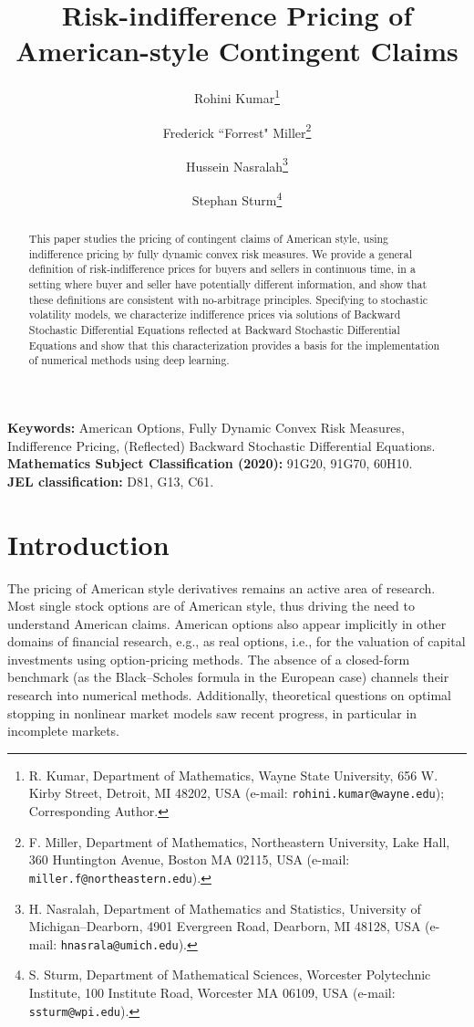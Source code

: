 \documentclass{article}
\title{Risk-indifference Pricing of American-style Contingent Claims}
\author{
Rohini Kumar\thanks{%
R. Kumar, Department of Mathematics, Wayne State University, 656 W. Kirby Street, Detroit, MI 48202, USA (e-mail: 
\texttt{rohini.kumar@wayne.edu}); Corresponding Author.}
\and
Frederick ``Forrest" Miller\thanks{%
F. Miller, Department of Mathematics, Northeastern University, Lake Hall, 360 Huntington Avenue, Boston MA 02115, USA (e-mail: 
\texttt{miller.f@northeastern.edu}).}
\and
Hussein Nasralah\thanks{%
H. Nasralah, Department of Mathematics and Statistics, University of Michigan--Dearborn, 4901 Evergreen Road, Dearborn, MI 48128, USA (e-mail: 
\texttt{hnasrala@umich.edu}).}
\and
Stephan Sturm\thanks{ %
S. Sturm, Department of Mathematical Sciences, Worcester Polytechnic Institute, 100 Institute Road, Worcester MA 06109, USA
	(e-mail: \texttt{ssturm@wpi.edu}).}
}
\begin{document}
\maketitle

\begin{abstract}
This paper studies the pricing of contingent claims of American style, using indifference pricing by fully dynamic convex risk measures. We provide a general definition of risk-indifference prices for buyers and sellers in continuous time, in a setting where buyer and seller have potentially different information, and show that these definitions are consistent with no-arbitrage principles. Specifying to stochastic volatility models, we characterize indifference prices via solutions of Backward Stochastic Differential Equations reflected at Backward Stochastic Differential Equations and show that this characterization provides a basis for the implementation of numerical methods using deep learning.
\end{abstract}

\vspace{5mm}
 
\begin{flushleft}
	 \textbf{Keywords:} American Options, Fully Dynamic Convex Risk Measures, Indifference Pricing, (Reflected) Backward Stochastic Differential Equations.\\
	 \textbf{Mathematics Subject Classification (2020):} 91G20, 91G70, 60H10.\\
	 \textbf{JEL classification:}  D81, G13,  C61.
\end{flushleft}





\section{Introduction}

The pricing of American style derivatives remains an active area of research. Most single stock options are of American style, thus driving the need to understand American claims. American options also appear implicitly in other domains of financial research, e.g., as real options, i.e., for the valuation of capital investments using option-pricing methods. The absence of a closed-form benchmark (as the Black--Scholes formula in the European case) channels their research into numerical methods. Additionally,  theoretical questions on optimal stopping in nonlinear market models saw recent progress, in particular in incomplete markets.
\end{document}
